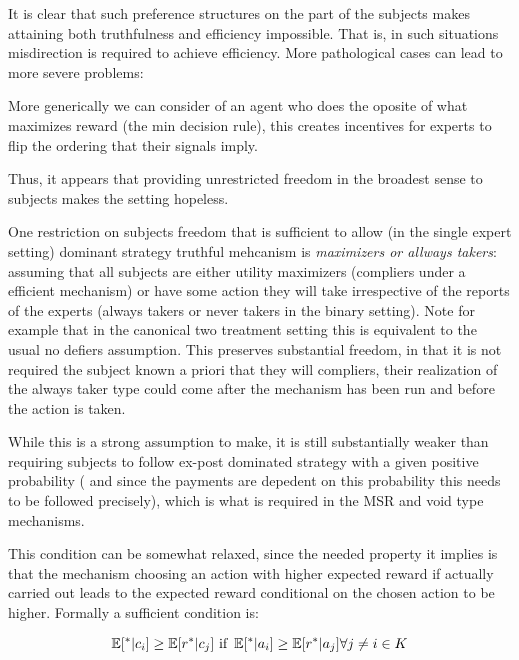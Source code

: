 It is clear that such preference structures on the part of the subjects makes attaining both truthfulness and efficiency impossible. That is, in such situations misdirection is required to achieve efficiency. More pathological cases can lead to more severe problems:

\begin{eg}
	More generically we can consider of an agent who does the oposite of what maximizes reward (the min decision rule), this creates incentives for experts to flip the ordering that their signals imply. 
\end{eg}

Thus, it appears that providing unrestricted freedom in the broadest sense to subjects makes the setting hopeless. 

One restriction on subjects freedom that is sufficient to allow (in the single expert setting) dominant strategy truthful mehcanism is \emph{maximizers or allways takers}: assuming that all subjects are either utility maximizers (compliers under a efficient mechanism) or have some action they will take irrespective of the reports of the experts (always takers or never takers in the binary setting). Note for example that in the canonical two treatment setting this is equivalent to the usual no defiers assumption. 
This preserves substantial freedom, in that it is not required the subject known a priori that they will compliers, their realization of the always taker type could come after the mechanism has been run and before the action is taken. 

While this is a strong assumption to make, it is still substantially weaker than requiring subjects to follow ex-post dominated strategy with a given positive probability ( and since the payments are depedent on this probability this needs to be followed precisely), which is what is required in the MSR and void type mechanisms.

This condition can be somewhat relaxed,  since the needed property it implies is that the mechanism choosing an action with higher expected reward if actually carried out leads to the expected reward conditional on the chosen action to be higher. Formally a sufficient condition is:

\[
\expec[ ^{*}|c_i]  \geq \expec[ r^{*}|c_j] \text{ if }\expec[ ^{*}|a_i]  \geq \expec[ r^{*}|a_j]  \forall j \neq i \in K
\]

